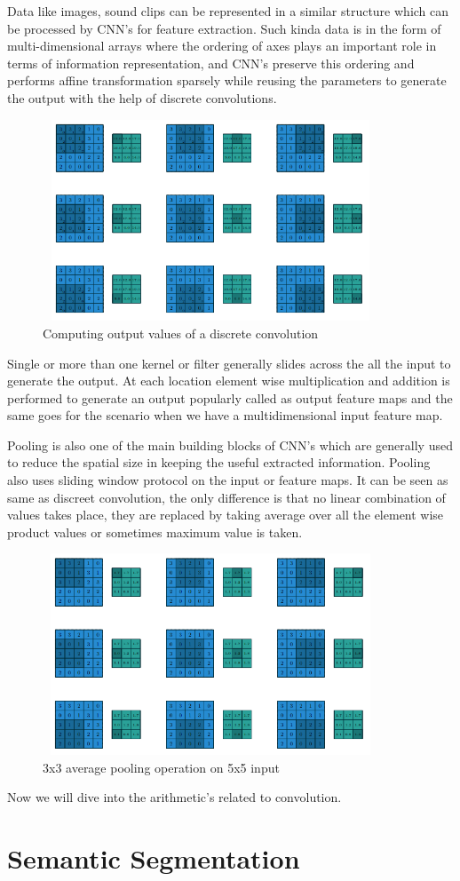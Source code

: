     Data like images, sound clips can be represented in a similar structure which can be processed by CNN's for feature extraction. Such kinda data is in the form of multi-dimensional arrays where the ordering of axes plays an important role in terms of information representation, and CNN's preserve this ordering and performs affine transformation sparsely while reusing the parameters to generate the output with the help of discrete convolutions. 
     \begin{figure}[h]
    \centering
    \includegraphics[width=10cm, height =6cm]{images/discrete_cnn.png}
    \caption{Computing output values of a discrete convolution \cite{https://doi.org/10.48550/arxiv.1603.07285}}
    \end{figure}
    
    Single or more than one kernel or filter generally slides across the all the input to generate the output. At each location element wise multiplication and addition is performed to generate an output popularly called as output feature maps and the same goes for the scenario when we have a multidimensional input feature map. 
    
    Pooling is also one of the main building blocks of CNN's which are generally used to reduce the spatial size in keeping the useful extracted information. Pooling also uses sliding window protocol on the input or feature maps. It can be seen as same as discreet convolution, the only difference is that no linear combination of values takes place, they are replaced by taking average over all the element wise product values or sometimes maximum value is taken. 
    \begin{figure}[h]
    \centering
    \includegraphics[width=10cm, height =6cm]{images/pooling_cnn.png}
    \caption{3x3 average pooling operation on 5x5 input \cite{https://doi.org/10.48550/arxiv.1603.07285}}
    \end{figure}
    
    Now we will dive into the arithmetic's related to convolution.
    
    \section{Semantic Segmentation}
    

